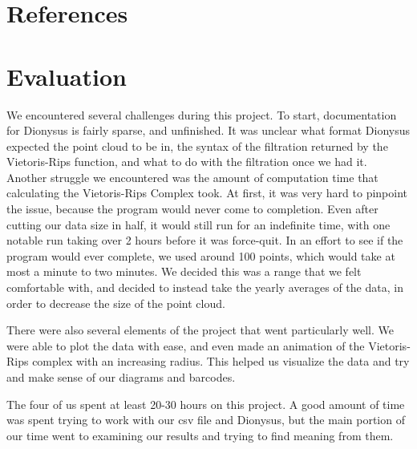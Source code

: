 \documentclass[12pt]{report}
\begin{document}
\section*{References}

\clearpage
\section*{Evaluation}
We encountered several challenges during this project. To start, documentation for Dionysus is fairly sparse, and unfinished. It was unclear what format Dionysus expected the point cloud to be in, the syntax of the filtration returned by the Vietoris-Rips function, and what to do with the filtration once we had it. Another struggle we encountered was the amount of computation time that calculating the Vietoris-Rips Complex took. At first, it was very hard to pinpoint the issue, because the program would never come to completion. Even after cutting our data size in half, it would still run for an indefinite time, with one notable run taking over 2 hours before it was force-quit. In an effort to see if the program would ever complete, we used around 100 points, which would take at most a minute to two minutes. We decided this was a range that we felt comfortable with, and decided to instead take the yearly averages of the data, in order to decrease the size of the point cloud.\par 
There were also several elements of the project that went particularly well. We were able to plot the data with ease, and even made an animation of the Vietoris-Rips complex with an increasing radius. This helped us visualize the data and try and make sense of our diagrams and barcodes. \par
The four of us spent at least 20-30 hours on this project. A good amount of time was spent trying to work with our csv file and Dionysus, but the main portion of our time went to examining our results and trying to find meaning from them. 

\clearpage
\end{document}
